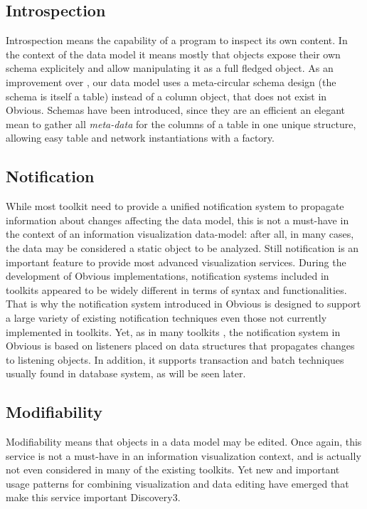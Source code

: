 \subsection{Introspection}

Introspection means the capability of a program to inspect its own content. In the context of the data model it means mostly that objects expose their own schema explicitely and allow manipulating it as a full fledged object. As an improvement over \cite{DesignPatternsIV}, our data model uses a meta-circular schema design (the schema is itself a table) instead of a column object, that does not exist in Obvious. Schemas have been introduced, since they are an efficient an elegant mean to gather all \emph{meta-data} for the columns of a table in one unique structure, allowing easy table and network instantiations with a factory.

\subsection{Notification}

While most toolkit need to provide a unified notification system to propagate information about changes affecting the data model, this is not a must-have in the context of an information visualization data-model: after all, in many cases, the data may be considered a static object to be analyzed. Still notification is an important feature to provide most advanced visualization services. During the development of Obvious implementations, notification systems included in toolkits appeared to be widely different in terms of syntax and functionalities.  That is why the notification system introduced in Obvious is designed to support a large variety of existing notification techniques even those not currently implemented in toolkits. Yet, as in many toolkits \cite{Prefuse,InfoVis,jung2003,Discovery1}, the notification system in Obvious is based on listeners placed on data structures that propagates changes to listening objects. In addition, it supports transaction and batch techniques usually found in database system, as will be seen later.

\subsection{Modifiability}

Modifiability means that objects in a data model may be edited. Once again, this service is not a must-have in an information visualization context, and is actually not even considered in many of the existing toolkits. Yet new and important usage patterns for combining visualization and data editing have emerged that make this service important {Discovery3}.

